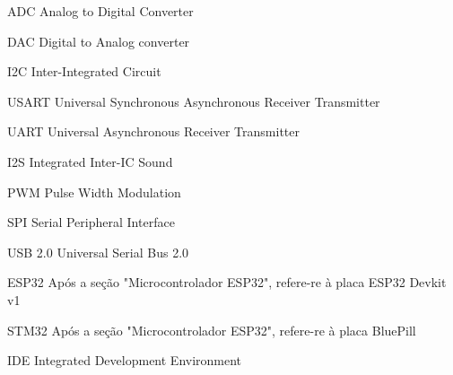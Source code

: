 







\frenchspacing 


	\imprimircapa

	\imprimirfolhaderosto*

	\listoffigures*
	\cleardoublepage

	\listoftables*
	\cleardoublepage


	\begin{siglas}
		\item[ADC] Analog to Digital Converter
		\item[DAC] Digital to Analog converter
		\item[I2C] Inter-Integrated Circuit
		\item[USART] Universal Synchronous Asynchronous Receiver Transmitter
		\item[UART] Universal Asynchronous Receiver Transmitter
		\item[I2S] Integrated Inter-IC Sound
		\item[PWM] Pulse Width Modulation
		\item[SPI] Serial Peripheral Interface
		\item[USB 2.0] Universal Serial Bus 2.0
		\item[ESP32] Após a seção "Microcontrolador ESP32", refere-re à placa ESP32 Devkit v1
		\item[STM32] Após a seção "Microcontrolador ESP32", refere-re à placa BluePill
		\item[IDE] Integrated Development Environment
	\end{siglas}

	\tableofcontents*
	\cleardoublepage


\textual

	

